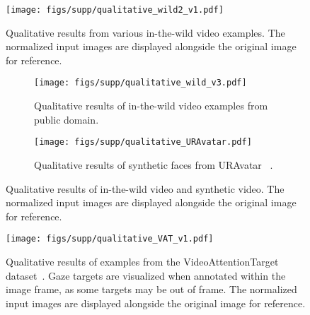 
\begin{figure*}[t]
  \centering
   \texttt{[image: figs/supp/qualitative\_wild2\_v1.pdf]}
   \caption{Qualitative results from various in-the-wild video examples.
   The normalized input images are displayed alongside the original image for reference.
   }
   \label{fig:results_qual_wild_one_person}
\end{figure*}


\begin{figure*}[t]
  \centering
  \begin{subfigure}{0.99\linewidth}
    \centering
    \texttt{[image: figs/supp/qualitative\_wild\_v3.pdf]}
    \caption{ Qualitative results of in-the-wild video examples from public domain.
    }
    \label{fig:results_qual_wild_public}
  \end{subfigure}
  \begin{subfigure}{0.99\linewidth}
    \centering
    \texttt{[image: figs/supp/qualitative\_URAvatar.pdf]}
    \caption{ Qualitative results of synthetic faces from URAvatar~\cite{li2024uravatar} .}
    \label{fig:results_qual_uravatar}
  \end{subfigure}
      \caption{Qualitative results of in-the-wild video and synthetic video.
      The normalized input images are displayed alongside the original image for reference.
    }
  \label{fig:results_qual_wild}
\end{figure*}


\begin{figure*}[t]
  \centering
   \texttt{[image: figs/supp/qualitative\_VAT\_v1.pdf]}
   \caption{Qualitative results of examples from the VideoAttentionTarget dataset~\cite{chong2020detecting}.
   Gaze targets are visualized when annotated within the image frame, as some targets may be out of frame.
   The normalized input images are displayed alongside the original image for reference.
   }
   \label{fig:results_qual_VAT}
\end{figure*}

